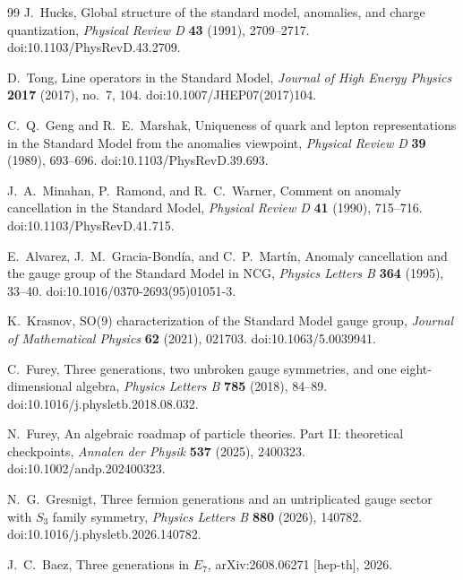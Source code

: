 \documentclass[11pt]{article}
\theoremstyle{definition}
\theoremstyle{remark}
\begin{document}
\begin{thebibliography}{99}
J.~Hucks,
\newblock Global structure of the standard model, anomalies, and charge
quantization,
\newblock \emph{Physical Review D} \textbf{43} (1991), 2709--2717.
\newblock doi:10.1103/PhysRevD.43.2709.

D.~Tong,
\newblock Line operators in the Standard Model,
\newblock \emph{Journal of High Energy Physics} \textbf{2017} (2017),
no.~7, 104.
\newblock doi:10.1007/JHEP07(2017)104.

C.~Q.~Geng and R.~E.~Marshak,
\newblock Uniqueness of quark and lepton representations in the Standard Model
from the anomalies viewpoint,
\newblock \emph{Physical Review D} \textbf{39} (1989), 693--696.
\newblock doi:10.1103/PhysRevD.39.693.

J.~A.~Minahan, P.~Ramond, and R.~C.~Warner,
\newblock Comment on anomaly cancellation in the Standard Model,
\newblock \emph{Physical Review D} \textbf{41} (1990), 715--716.
\newblock doi:10.1103/PhysRevD.41.715.

E.~Alvarez, J.~M.~Gracia-Bond\'ia, and C.~P.~Mart\'in,
\newblock Anomaly cancellation and the gauge group of the Standard Model in
NCG,
\newblock \emph{Physics Letters B} \textbf{364} (1995), 33--40.
\newblock doi:10.1016/0370-2693(95)01051-3.

K.~Krasnov,
\newblock SO(9) characterization of the Standard Model gauge group,
\newblock \emph{Journal of Mathematical Physics} \textbf{62} (2021), 021703.
\newblock doi:10.1063/5.0039941.

C.~Furey,
\newblock Three generations, two unbroken gauge symmetries, and one
eight-dimensional algebra,
\newblock \emph{Physics Letters B} \textbf{785} (2018), 84--89.
\newblock doi:10.1016/j.physletb.2018.08.032.

N.~Furey,
\newblock An algebraic roadmap of particle theories. Part II: theoretical checkpoints,
\newblock \emph{Annalen der Physik} \textbf{537} (2025), 2400323.
\newblock doi:10.1002/andp.202400323.

N.~G.~Gresnigt,
\newblock Three fermion generations and an untriplicated gauge sector with
$S_3$ family symmetry,
\newblock \emph{Physics Letters B} \textbf{880} (2026), 140782.
\newblock doi:10.1016/j.physletb.2026.140782.

J.~C.~Baez,
\newblock Three generations in $E_7$,
\newblock arXiv:2608.06271 [hep-th], 2026.


\end{thebibliography}
\end{document}
